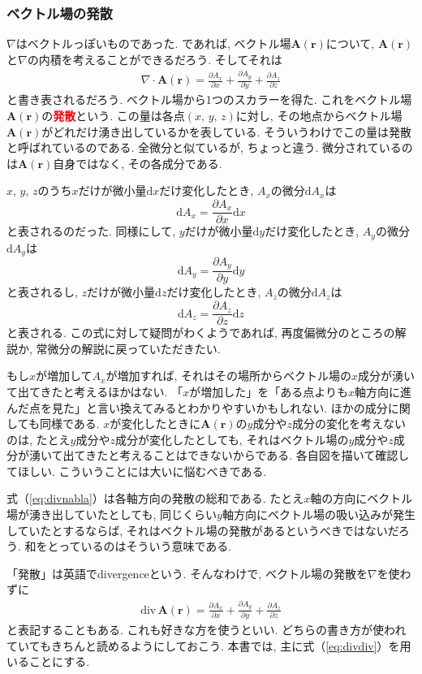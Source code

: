 \subsubsection{ベクトル場の発散}
$\nabla$はベクトルっぽいものであった. であれば, ベクトル場$\bm{A}(\bm{r})$について, 
$\bm{A}(\bm{r})$と$\nabla$の内積を考えることができるだろう. そしてそれは
\begin{eqnarray}
\nabla \cdot \bm{A} (\bm{r}) =  \frac{\partial A_x}{\partial x} + \frac{\partial A_y}{\partial y} +  \frac{\partial A_z}{\partial z}
\label{eq:divnabla}
\end{eqnarray}
と書き表されるだろう. ベクトル場から1つのスカラーを得た. 
これをベクトル場$\bm{A}(\bm{r})$の\textbf{\textcolor{red}{発散}}という. 
この量は各点$(x, \, y, \, z)$に対し, その地点からベクトル場$\bm{A}(\bm{r})$がどれだけ湧き出しているかを表している. 
そういうわけでこの量は発散と呼ばれているのである. 全微分と似ているが, ちょっと違う. 
微分されているのは$\bm{A}(\bm{r})$自身ではなく, その各成分である. 

$x$, $y$, $z$のうち$x$だけが微小量$\mathrm{d}x$だけ変化したとき, $A_x$の微分$\mathrm{d} A_x$は
$$
\mathrm{d} A_x = \frac{\partial A_x}{\partial x} \mathrm{d}x
$$
と表されるのだった. 
同様にして, $y$だけが微小量$\mathrm{d}y$だけ変化したとき, $A_y$の微分$\mathrm{d} A_y$は
$$
\mathrm{d} A_y = \frac{\partial A_y}{\partial y} \mathrm{d}y
$$
と表されるし, $z$だけが微小量$\mathrm{d}z$だけ変化したとき, $A_z$の微分$\mathrm{d} A_z$は
$$
\mathrm{d} A_z = \frac{\partial A_z}{\partial z} \mathrm{d}z
$$
と表される. この式に対して疑問がわくようであれば, 再度偏微分のところの解説か, 常微分の解説に戻っていただきたい. 

もし$x$が増加して$A_x$が増加すれば, 
それはその場所からベクトル場の$x$成分が湧いて出てきたと考えるほかはない. 
「$x$が増加した」を「ある点よりも$x$軸方向に進んだ点を見た」と言い換えてみるとわかりやすいかもしれない. 
ほかの成分に関しても同様である. $x$が変化したときに$\bm{A}(\bm{r})$の$y$成分や$z$成分の変化を考えないのは, 
たとえ$y$成分や$z$成分が変化したとしても, 
それはベクトル場の$y$成分や$z$成分が湧いて出てきたと考えることはできないからである. 
各自図を描いて確認してほしい. こういうことには大いに悩むべきである. 

式（\ref{eq:divnabla}）は各軸方向の発散の総和である. 
たとえ$x$軸の方向にベクトル場が湧き出していたとしても, 
同じくらい$y$軸方向にベクトル場の吸い込みが発生していたとするならば, 
それはベクトル場の発散があるというべきではないだろう. 和をとっているのはそういう意味である. 

「発散」は英語でdivergenceという. そんなわけで, ベクトル場の発散を$\nabla$を使わずに
\begin{eqnarray}
\mathrm{div} \, \bm{A}(\bm{r}) = \frac{\partial A_x}{\partial x} + \frac{\partial A_y}{\partial y} +  \frac{\partial A_z}{\partial z}
\label{eq:divdiv}
\end{eqnarray}
と表記することもある. これも好きな方を使うといい. 
どちらの書き方が使われていてもきちんと読めるようにしておこう. 
本書では, 主に式（\ref{eq:divdiv}）を用いることにする. 
